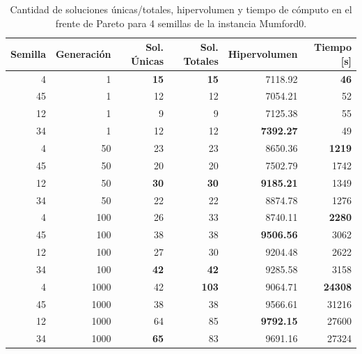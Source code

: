 \begin{table}[!htb]
\centering
\begin{tabular}{|r|r|r|r|r|r|}
\hline
Semilla & Generación & Sol. Únicas & Sol. Totales & Hipervolumen & Tiempo [s]\\  
\hline \hline
4 & 1 & \textbf{15} & \textbf{15} & 7118.92 & \textbf{46} \\ \hline
45 & 1 & 12 & 12 & 7054.21 & 52 \\ \hline
12 & 1 & 9 & 9 & 7125.38 & 55 \\ \hline
34 & 1 & 12 & 12 & \textbf{7392.27} & 49 \\ \hline\hline
4 & 50 & 23 & 23 & 8650.36 & \textbf{1219} \\ \hline
45 & 50 & 20 & 20 & 7502.79 & 1742 \\ \hline
12 & 50 & \textbf{30} & \textbf{30} & \textbf{9185.21} & 1349 \\ \hline
34 & 50 & 22 & 22 & 8874.78 & 1276 \\ \hline\hline
4 & 100 & 26 & 33 & 8740.11 & \textbf{2280} \\ \hline
45 & 100 & 38 & 38 & \textbf{9506.56} & 3062 \\ \hline
12 & 100 & 27 & 30 & 9204.48 & 2622 \\ \hline
34 & 100 & \textbf{42} & \textbf{42} & 9285.58 & 3158 \\ \hline\hline
4 & 1000 & 42 & \textbf{103} & 9064.71 & \textbf{24308} \\ \hline
45 & 1000 & 38 & 38 & 9566.61 & 31216 \\ \hline
12 & 1000 & 64 & 85 & \textbf{9792.15} & 27600 \\ \hline
34 & 1000 & \textbf{65} & 83 & 9691.16 & 27324 \\ \hline\hline
\end{tabular}
\caption{Cantidad de soluciones únicas/totales, hipervolumen y tiempo de cómputo en el frente de Pareto para 4 semillas de la instancia Mumford0.}
\label{tab:dataFrenteMumford0}
\end{table}

